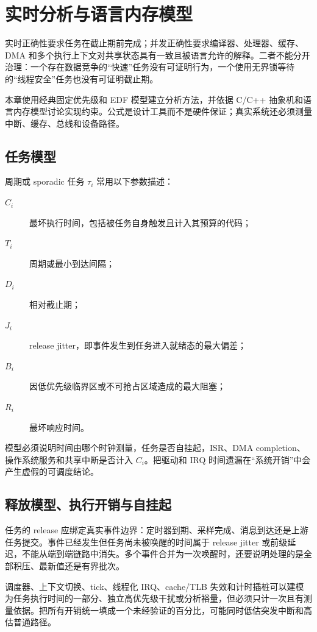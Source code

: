 \chapter{实时分析与语言内存模型}
\label{chap:realtime-language-memory-model}

实时正确性要求任务在截止期前完成；并发正确性要求编译器、处理器、缓存、DMA 和多个执行上下文对共享状态具有一致且被语言允许的解释。二者不能分开治理：一个存在数据竞争的“快速”任务没有可证明行为，一个使用无界锁等待的“线程安全”任务也没有可证明截止期。

本章使用经典固定优先级和 EDF 模型建立分析方法\cite{liu-layland-1973,joseph-pandya-1986}，并依据 C/C++ 抽象机和语言内存模型讨论实现约束\cite{iso-c-2024,iso-cpp-2024}。公式是设计工具而不是硬件保证；真实系统还必须测量中断、缓存、总线和设备路径。

\section{任务模型}

周期或 sporadic 任务 $\tau_i$ 常用以下参数描述：
\begin{description}
  \item[$C_i$] 最坏执行时间，包括被任务自身触发且计入其预算的代码；
  \item[$T_i$] 周期或最小到达间隔；
  \item[$D_i$] 相对截止期；
  \item[$J_i$] release jitter，即事件发生到任务进入就绪态的最大偏差；
  \item[$B_i$] 因低优先级临界区或不可抢占区域造成的最大阻塞；
  \item[$R_i$] 最坏响应时间。
\end{description}

模型必须说明时间由哪个时钟测量，任务是否自挂起，ISR、DMA completion、操作系统服务和共享中断是否计入 $C_i$。把驱动和 IRQ 时间遗漏在“系统开销”中会产生虚假的可调度结论。

\section{释放模型、执行开销与自挂起}

任务的 release 应绑定真实事件边界：定时器到期、采样完成、消息到达还是上游任务提交。事件已经发生但任务尚未被唤醒的时间属于 release jitter 或前级延迟，不能从端到端链路中消失。多个事件合并为一次唤醒时，还要说明处理的是全部积压、最新值还是有界批次。

调度器、上下文切换、tick、线程化 IRQ、cache/TLB 失效和计时插桩可以建模为任务执行时间的一部分、独立高优先级干扰或分析裕量，但必须只计一次且有测量依据。把所有开销统一填成一个未经验证的百分比，可能同时低估突发中断和高估普通路径。

